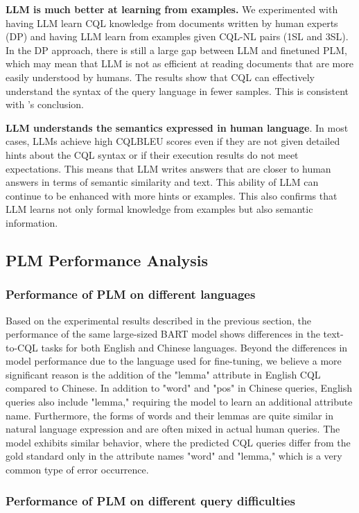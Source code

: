 \documentclass[11pt]{article}
\begin{document}
\begin{CJK*}{UTF8}{gbsn}
\textbf{LLM is much better at learning from examples.} We experimented with having LLM learn CQL knowledge from documents written by human experts (DP) and having LLM learn from examples given CQL-NL pairs (1SL and 3SL). In the DP approach, there is still a large gap between LLM and finetuned PLM, which may mean that LLM is not as efficient at reading documents that are more easily understood by humans. The results show that CQL can effectively understand the syntax of the query language in fewer samples. This is consistent with \citet{staniek2023texttooverpassql}'s conclusion.

\textbf{LLM understands the semantics expressed in human language}. In most cases, LLMs achieve high CQLBLEU scores even if they are not given detailed hints about the CQL syntax or if their execution results do not meet expectations. This means that LLM writes answers that are closer to human answers in terms of semantic similarity and text. This ability of LLM can continue to be enhanced with more hints or examples. This also confirms that LLM learns not only formal knowledge from examples but also semantic information.

\subsection{PLM Performance Analysis}

\subsubsection{Performance of PLM on different languages}
Based on the experimental results described in the previous section, the performance of the same large-sized BART model shows differences in the text-to-CQL tasks for both English and Chinese languages. Beyond the differences in model performance due to the language used for fine-tuning, we believe a more significant reason is the addition of the "lemma" attribute in English CQL compared to Chinese. In addition to "word" and "pos" in Chinese queries, English queries also include "lemma," requiring the model to learn an additional attribute name. Furthermore, the forms of words and their lemmas are quite similar in natural language expression and are often mixed in actual human queries. The model exhibits similar behavior, where the predicted CQL queries differ from the gold standard only in the attribute names "word" and "lemma," which is a very common type of error occurrence.

\subsubsection{Performance of PLM on different query difficulties}


\end{CJK*}
\end{document}
